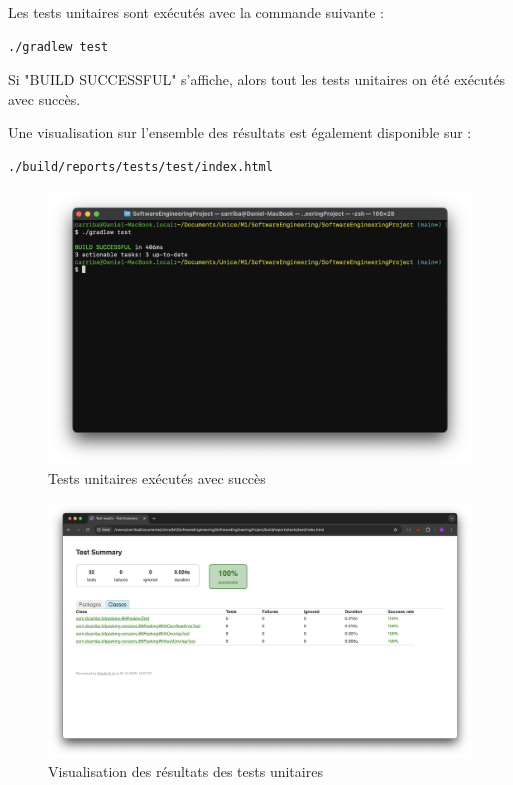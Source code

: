 \documentclass[titlepage]{article}
\begin{document}
Les tests unitaires sont exécutés avec la commande suivante :
\begin{lstlisting}[language=Bash]
./gradlew test
\end{lstlisting}
Si "BUILD SUCCESSFUL" s'affiche, alors tout les tests unitaires on été exécutés avec succès.
\par Une visualisation sur l'ensemble des résultats est également disponible sur :
\begin{lstlisting}[language=Bash]
./build/reports/tests/test/index.html
\end{lstlisting}
\begin{figure}[h!]
    \centering
    \includegraphics[width=1\textwidth]{img/unitTestsTerminal.png}
    \caption{Tests unitaires exécutés avec succès}
    \label{fig:unitTestsResults}
\end{figure}
\begin{figure}[h!]
    \centering
    \includegraphics[width=1\textwidth]{img/unitTestsResults.png}
    \caption{Visualisation des résultats des tests unitaires}
    \label{fig:unitTestsResults}
\end{figure}
\end{document}
